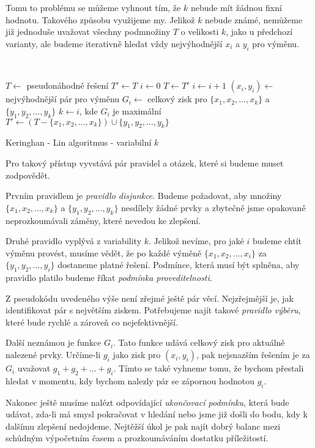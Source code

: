 \documentclass[
  biblatex,
  figures=false,
  glossaries,
  index
]{kidiplom}
\begin{document}
Tomu to problému se můžeme vyhnout tím, že $k$ nebude mít žádnou fixní hodnotu. Takového způsobu využijeme my. Jelikož $k$ nebude známé, nemůžeme již jednoduše uvažovat všechny podmnožiny $T$ o velikosti $k$, jako u předchozí varianty, ale budeme iterativně hledat vždy nejvýhodnější $x_i$ a $y_i$ pro výměnu.
\newline

{\LinesNumbered\SetAlgoNoLine\
\begin{algorithm}[H]
%
$T \leftarrow$ pseudonáhodné řešení\;
$T' \leftarrow T$\;
{
$i \leftarrow 0$\;
$T \leftarrow T'$\;
{
$i \leftarrow i + 1$\;
$(x_i, y_i) \leftarrow$ nejvýhodnější pár pro výměnu\;
$G_i \leftarrow$ celkový zisk pro $\{x_1, x_2, ..., x_k\}$ a $\{y_1, y_2, ..., y_k\}$\;
}
$k \leftarrow i$, kde $G_i$ je maximální \;
$T' \leftarrow (T - \{x_1, x_2, ..., x_k\}) \cup \{y_1, y_2, ..., y_k\}$\;
}
\Return \;
\caption{Keringhan - Lin algoritmus - variabilní $k$}
\end{algorithm}}\leavevmode\newline


Pro takový přístup vyvstává pár pravidel a otázek, které si budeme muset zodpovědět.

Prvním pravidlem je \textit{pravidlo disjunkce}. Budeme požadovat, aby množiny $\{x_1, x_2, ..., x_k\}$ a $\{y_1, y_2, ..., y_k\}$ nesdílely žádné prvky a zbytečně jsme opakovaně neprozkoumávali záměny, které nevedou ke zlepšení.

Druhé pravidlo vyplývá z variability $k$. Jelikož nevíme, pro jaké $i$ budeme chtít výměnu provést, musíme vědět, že po každé výměně $\{x_1, x_2, ..., x_i\}$ za $\{y_1, y_2, ..., y_i\}$ dostaneme platné řešení. Podmínce, která musí být splněna, aby pravidlo platilo budeme říkat \textit{podmínka proveditelnosti}.

Z pseudokódu uvedeného výše není zřejmé ještě pár věcí. Nejzřejmější je, jak identifikovat pár s největším ziskem. Potřebujeme najít takové \textit{pravidlo výběru}, které bude rychlé a zároveň co nejefektivnější.

Další neznámou je funkce $G_i$. Tato funkce udává celkový zisk pro aktuálně nalezené prvky. Určíme-li $g_i$ jako zisk pro $(x_i, y_i)$, pak nejsnazším řešením je za $G_i$ uvažovat $g_1 + g_2 + ... + g_i$. Tímto se také vyhneme tomu, že bychom přestali hledat v momentu, kdy bychom nalezly pár se zápornou hodnotou $g_i$.

Nakonec ještě musíme nalézt odpovídající \textit{ukončovací podmínku}, která bude udávat, zda-li má smysl pokračovat v hledání nebo jsme již došli do bodu, kdy k dalšímu zlepšení nedojdeme. Nejtěžší úkol je pak najít dobrý balanc mezi schůdným výpočetním časem a prozkoumáváním dostatku příležitostí.
\end{document}
